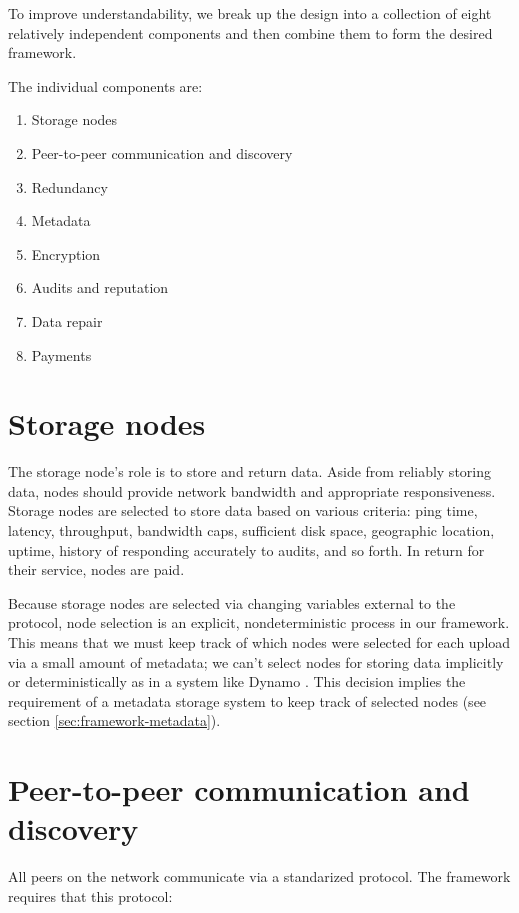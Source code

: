 \documentclass[8pt,fleqn,openany]{book}
\begin{document}
To improve understandability, we break up the design into a collection of eight
relatively independent components and then combine them to form the desired
framework.

The individual components are:

\begin{enumerate}
\item Storage nodes
\item Peer-to-peer communication and discovery
\item Redundancy
\item Metadata
\item Encryption
\item Audits and reputation
\item Data repair
\item Payments
\end{enumerate}

\section{Storage nodes}

The storage node's role is to store and return data.
Aside from reliably storing data, nodes should provide
network bandwidth and appropriate responsiveness.
Storage nodes are selected to store data based on various criteria: ping time,
latency, throughput, bandwidth caps, sufficient disk space,
geographic location, uptime, history of responding accurately to audits, and
so forth. In return for their service, nodes are paid.

Because storage
nodes are selected via changing variables external to the protocol, node
selection is an explicit, nondeterministic process in our framework. This means
that we must keep track of which nodes were selected for each upload via a
small amount of metadata; we can't select nodes for storing data implicitly or
deterministically as in a system like Dynamo \cite{dynamo}. This decision
implies the requirement of a metadata storage system to keep track
of selected nodes (see section \ref{sec:framework-metadata}).

\section{Peer-to-peer communication and discovery}

All peers on the network communicate via a standarized protocol. The
framework requires that this protocol:
\end{document}
